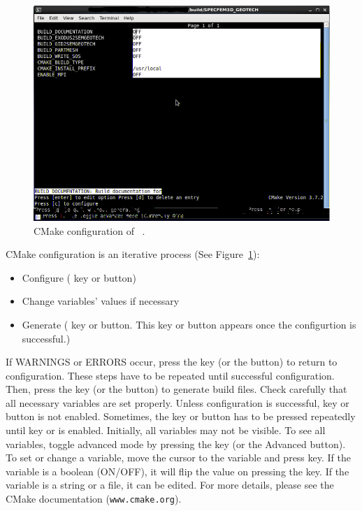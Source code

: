 \begin{figure}[ht]
\centering
\includegraphics[scale=1.0]{cmake}
\caption{CMake configuration of \pack\ .}
\label{fig:cmake}
\end{figure}

CMake configuration is an iterative process (See Figure~\ref{fig:cmake}):
\begin{itemize}
\item Configure ( key or  button)
\item Change variables' values if necessary
\item Generate ( key or  button. This key or button appears once the configurtion is successful.)
\end{itemize}

If WARNINGS or ERRORS occur, press the  key (or the  button) to return to configuration. These steps have to be repeated until successful configuration. Then, press the  key (or the  button) to generate build files. Check carefully that all necessary variables are set properly. Unless configuration is successful,  key or  button is not enabled. Sometimes, the  key or  button has to be pressed repeatedly until  key or  is enabled. Initially, all variables may not be visible. To see all variables, toggle advanced mode by pressing the  key (or the Advanced button).
To set or change a variable, move the cursor to the variable and press  key. If the variable is a boolean (ON/OFF), it will flip the value on pressing the  key. If the variable is a string or a file, it can be edited. For more details, please see the CMake documentation (\texttt{www.cmake.org}).
\\

